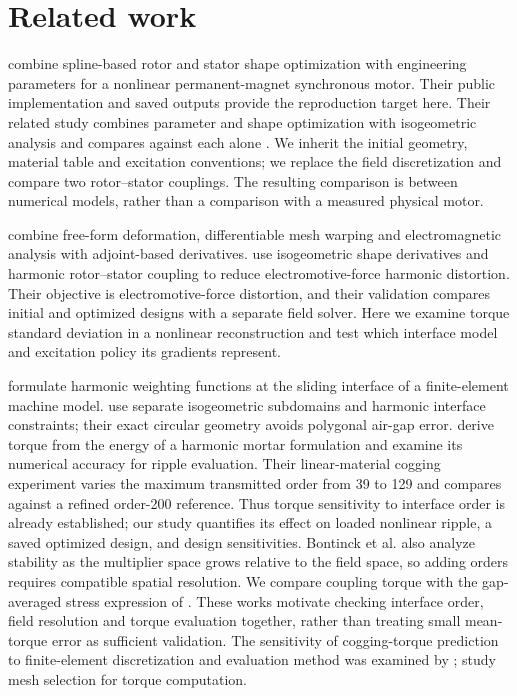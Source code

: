 \documentclass{anvil-paper}
\begin{document}
\section{Related work}
\citet{wiesheu2024spline} combine spline-based rotor and stator shape
optimization with engineering parameters for a nonlinear permanent-magnet
synchronous motor. Their public implementation and saved outputs provide
the reproduction target here. Their related study combines parameter and
shape optimization with isogeometric analysis and compares against each alone
\citep{wiesheu2025combined}. We inherit the initial geometry, material
table and excitation conventions; we replace the field discretization and compare two
rotor--stator couplings. The resulting comparison is between numerical
models, rather than a comparison with a measured physical motor.

\citet{scotzniovsky2025} combine free-form deformation, differentiable
mesh warping and electromagnetic analysis with adjoint-based derivatives.
\citet{merkel2021shape} use isogeometric shape derivatives and harmonic
rotor--stator coupling to reduce electromotive-force harmonic distortion.
Their objective is electromotive-force distortion, and their validation
compares initial and optimized designs with a separate field solver.
Here we examine torque standard deviation in a nonlinear reconstruction
and test which interface model and excitation policy its gradients represent.

\citet{degersem2004harmonic} formulate harmonic weighting functions at
the sliding interface of a finite-element machine model.
\citet{bontinck2018isogeometric} use separate isogeometric subdomains and
harmonic interface constraints; their exact circular geometry avoids
polygonal air-gap error. \citet{egger2022torque} derive torque from the
energy of a harmonic mortar formulation and examine its numerical
accuracy for ripple evaluation. Their linear-material cogging experiment
varies the maximum transmitted order from 39 to 129 and compares against
a refined order-200 reference. Thus torque sensitivity to interface order
is already established; our study quantifies its effect on loaded nonlinear
ripple, a saved optimized design, and design sensitivities.
Bontinck et al. also analyze stability as the multiplier space grows
relative to the field space, so adding orders requires compatible spatial
resolution. We compare coupling torque with the
gap-averaged stress expression of \citet{arkkio1987}. These works motivate
checking interface order, field resolution and torque evaluation together,
rather than treating small mean-torque error as sufficient validation.
The sensitivity of cogging-torque prediction to finite-element
discretization and evaluation method was examined by \citet{howe1992cogging};
\citet{arkkio2012proper} study mesh selection for torque computation.
\end{document}
